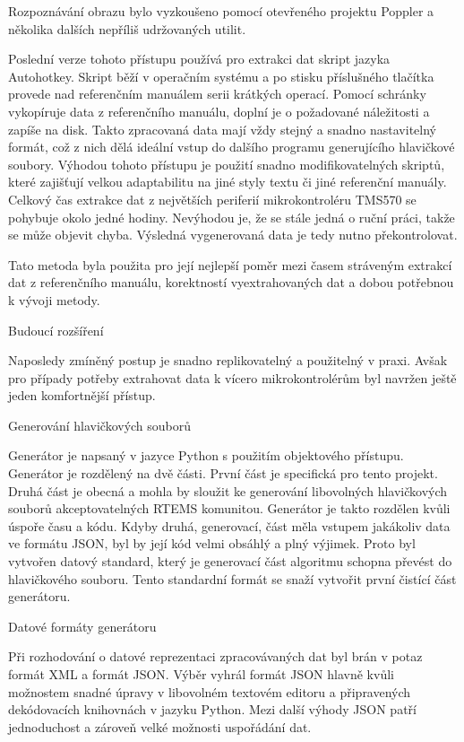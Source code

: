 Rozpoznávání obrazu bylo vyzkoušeno pomocí otevřeného projektu Poppler a několika dalších nepříliš udržovaných utilit.

Poslední verze tohoto přístupu používá pro extrakci dat skript jazyka Autohotkey. Skript běží v operačním systému a po stisku příslušného tlačítka provede nad referenčním manuálem serii krátkých operací. Pomocí schránky vykopíruje data z referenčního manuálu, doplní je o požadované náležitosti a zapíše na disk. Takto zpracovaná data mají vždy stejný a snadno nastavitelný formát, což z nich dělá ideální vstup do dalšího programu generujícího hlavičkové soubory. Výhodou tohoto přístupu je použití snadno modifikovatelných skriptů, které zajišťují velkou adaptabilitu na jiné styly textu či jiné referenční manuály. Celkový čas extrakce dat z největších periferií mikrokontroléru TMS570 se pohybuje okolo jedné hodiny. Nevýhodou je, že se stále jedná o ruční práci, takže se může objevit chyba. Výsledná vygenerovaná data je tedy nutno překontrolovat.

Tato metoda byla použita pro její nejlepší poměr mezi časem stráveným extrakcí dat z referenčního manuálu, korektností vyextrahovaných dat a dobou potřebnou k vývoji metody.

\secc Budoucí rozšíření

	Naposledy zmíněný postup je snadno replikovatelný a použitelný v praxi. Avšak pro případy potřeby extrahovat data k vícero mikrokontrolérům byl navržen ještě jeden komfortnější přístup. %

\sec Generování hlavičkových souborů

	Generátor je napsaný v jazyce Python s použitím objektového přístupu. Generátor je rozdělený na dvě části. První část je specifická pro tento projekt. Druhá část je obecná a mohla by sloužit ke generování libovolných hlavičkových souborů akceptovatelných RTEMS komunitou. Generátor je takto rozdělen kvůli úspoře času a kódu. Kdyby druhá, generovací, část měla vstupem jakákoliv data ve formátu JSON, byl by její kód velmi obsáhlý a plný výjimek. Proto byl vytvořen datový standard, který je generovací část algoritmu schopna převést do hlavičkového souboru. Tento standardní formát se snaží vytvořit první čistící část generátoru.

\secc Datové formáty generátoru

	Při rozhodování o datové reprezentaci zpracovávaných dat byl brán v potaz formát XML a formát JSON. Výběr vyhrál formát JSON hlavně kvůli možnostem snadné úpravy v libovolném textovém editoru a připravených dekódovacích knihovnách v jazyku Python. Mezi další výhody JSON patří jednoduchost a zároveň velké možnosti uspořádání dat. 

